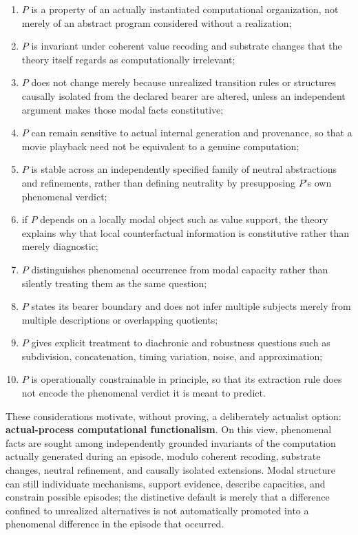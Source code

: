 \documentclass[11pt,a4paper]{article}
\begin{document}
\begin{enumerate}
  \item $P$ is a property of an actually instantiated computational organization, not merely of an abstract program considered without a realization;
  \item $P$ is invariant under coherent value recoding and substrate changes that the theory itself regards as computationally irrelevant;
  \item $P$ does not change merely because unrealized transition rules or structures causally isolated from the declared bearer are altered, unless an independent argument makes those modal facts constitutive;
  \item $P$ can remain sensitive to actual internal generation and provenance, so that a movie playback need not be equivalent to a genuine computation;
  \item $P$ is stable across an independently specified family of neutral abstractions and refinements, rather than defining neutrality by presupposing $P$'s own phenomenal verdict;
  \item if $P$ depends on a locally modal object such as value support, the theory explains why that local counterfactual information is constitutive rather than merely diagnostic;
  \item $P$ distinguishes phenomenal occurrence from modal capacity rather than silently treating them as the same question;
  \item $P$ states its bearer boundary and does not infer multiple subjects merely from multiple descriptions or overlapping quotients;
  \item $P$ gives explicit treatment to diachronic and robustness questions such as subdivision, concatenation, timing variation, noise, and approximation;
  \item $P$ is operationally constrainable in principle, so that its extraction rule does not encode the phenomenal verdict it is meant to predict.
\end{enumerate}

\begin{thesisbox}[title={A plausible default architecture}]
These considerations motivate, without proving, a deliberately actualist option: \textbf{actual-process computational functionalism}. On this view, phenomenal facts are sought among independently grounded invariants of the computation actually generated during an episode, modulo coherent recoding, substrate changes, neutral refinement, and causally isolated extensions. Modal structure can still individuate mechanisms, support evidence, describe capacities, and constrain possible episodes; the distinctive default is merely that a difference confined to unrealized alternatives is not automatically promoted into a phenomenal difference in the episode that occurred.
\end{thesisbox}
\end{document}
